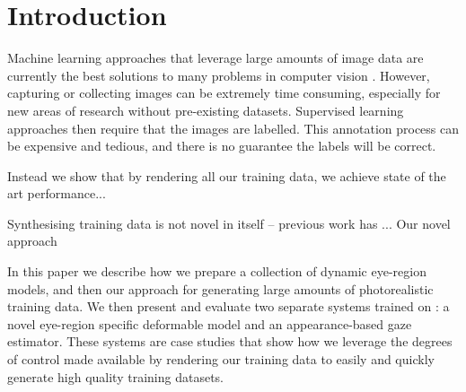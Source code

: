 
\section{Introduction}

Machine learning approaches that leverage large amounts of image data are currently the best solutions to many problems in computer vision . However, capturing or collecting images can be extremely time consuming, especially for new areas of research without pre-existing datasets. Supervised learning approaches then require that the images are labelled. This annotation process can be expensive and tedious, and there is no guarantee the labels will be correct.

Instead we show that by rendering all our training data, we achieve state of the art performance...

Synthesising training data is not novel in itself -- previous work has ... Our novel approach 

In this paper we describe how we prepare a collection of dynamic eye-region models, and then our approach for generating large amounts of photorealistic training data. We then present and evaluate two separate systems trained on \dataset: a novel eye-region specific deformable model and an appearance-based gaze estimator.
%
These systems are case studies that show how we leverage the degrees of control made available by rendering our training data to easily and quickly generate high quality training datasets.

